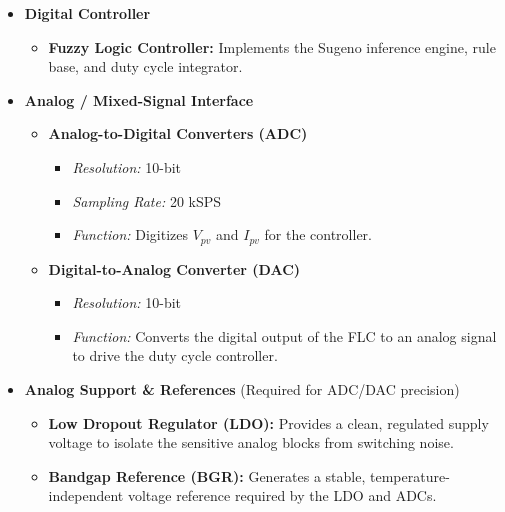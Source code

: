\documentclass[a4paper,oneside,12pt]{report}
\numberwithin{equation}{chapter}
\begin{document}
\begin{itemize}
    \item \textbf{Digital Controller}
    \begin{itemize}
        \item \textbf{Fuzzy Logic Controller:} Implements the Sugeno inference engine, rule base, and duty cycle integrator.
    \end{itemize}
    
    \item \textbf{Analog / Mixed-Signal Interface}
    \begin{itemize}
        \item \textbf{Analog-to-Digital Converters (ADC)}
        \begin{itemize}
            \item \textit{Resolution:} 10-bit
            \item \textit{Sampling Rate:} 20 kSPS
            \item \textit{Function:} Digitizes $V_{pv}$ and $I_{pv}$ for the controller.
        \end{itemize}
        \item \textbf{Digital-to-Analog Converter (DAC)}
        \begin{itemize}
            \item \textit{Resolution:} 10-bit
            \item \textit{Function:} Converts the digital output of the FLC to an analog signal to drive the duty cycle controller.
        \end{itemize}
    \end{itemize}

    \item \textbf{Analog Support \& References} (Required for ADC/DAC precision)
    \begin{itemize}
        \item \textbf{Low Dropout Regulator (LDO):} Provides a clean, regulated supply voltage to isolate the sensitive analog blocks from switching noise.
        \item \textbf{Bandgap Reference (BGR):} Generates a stable, temperature-independent voltage reference required by the LDO and ADCs.
    \end{itemize}
    

\end{itemize}
\end{document}

